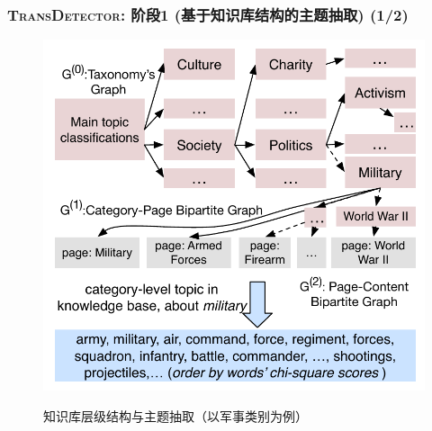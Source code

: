 \begin{frame}
\frametitle{\noindent \textsc{TransDetector}: 阶段1 (基于知识库结构的主题抽取) (1/2)}	
\vspace{-4mm}
\begin{figure}[h]
		\setlength{\abovecaptionskip}{0.cm}
        \setlength{\belowcaptionskip}{0.cm}
        \centering
		\caption{知识库层级结构与主题抽取（以军事类别为例）}
        \includegraphics[width=0.6\columnwidth]{img/initializationExample.pdf}
        \label{fig:hood}
\end{figure}
\end{frame}

